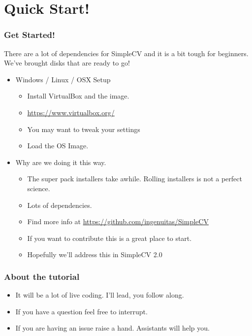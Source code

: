 \documentclass[compress]{beamer}
\begin{document}
\section{Quick Start!}
 \begin{frame}
   \frametitle{Get Started!}
   There are a lot of dependencies for SimpleCV and it is a bit tough for
   beginners. We've brought disks that are ready to go!
   \begin{itemize}
     \item Windows / Linux / OSX Setup 
       \begin{itemize}
         \item Install VirtualBox and the image. 
         \item \url{https://www.virtualbox.org/}
         \item You may want to tweak your settings
         \item Load the OS Image.
         \end{itemize}
\item Why are we doing it this way.
       \begin{itemize}
         \item The super pack installers take awhile. Rolling
           installers is not a perfect science.
         \item Lots of dependencies. 
         \item Find more info at \url{https://github.com/ingenuitas/SimpleCV}
         \item If you want to contribute this is a great place to start.
         \item Hopefully we'll address this in SimpleCV 2.0
         \end{itemize}
    \end{itemize}
 \end{frame}

\begin{frame}
  \frametitle{About the tutorial}
  \begin{itemize}
    \item It will be a lot of live coding. I'll lead, you follow along.
    \item If you have a question feel free to interrupt. 
    \item If you are having an issue raise a hand. Assistants will help
      you. 
    \end{itemize}
\end{frame}
\end{document}
